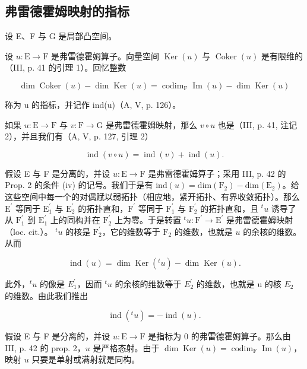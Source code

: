 \subsection{弗雷德霍姆映射的指标}

设 E、F 与 G 是局部凸空间。

设 \(u \colon \mathrm{E} \to \mathrm{F}\) 是弗雷德霍姆算子。向量空间 \(\operatorname{Ker}(u)\) 与 \(\operatorname{Coker}(u)\) 是有限维的（III, p. 41 的引理 1）。回忆整数

\[
\dim \operatorname{Coker} (u) - \dim \operatorname{Ker} (u) = \operatorname{codim} _ {\mathrm{F}} \operatorname{Im} (u) - \dim \operatorname{Ker} (u) \tag {1}
\]

称为 u 的指标，并记作 ind(u)（A, V, p. 126）。

如果 \(u \colon \mathrm{E} \to \mathrm{F}\) 与 \(v \colon \mathrm{F} \to \mathrm{G}\) 是弗雷德霍姆映射，那么 \(v \circ u\) 也是（III, p. 41, 注记 2），并且我们有（A, V, p. 127, 引理 2）

\[
\operatorname{ind} (v \circ u) = \operatorname{ind} (v) + \operatorname{ind} (u).\tag{2}
\]

假设 E 与 F 是分离的，并设 \(u\colon\mathrm{E}\to\mathrm{F}\) 是弗雷德霍姆算子；采用 III, p. 42 的 Prop. 2 的条件 (iv) 的记号。我们于是有 \(\mathrm{ind}(u)=\mathrm{dim}(\mathrm{F}_{2})-\mathrm{dim}(\mathrm{E}_{2})\)。给这些空间中每一个的对偶赋以弱拓扑（相应地，紧开拓扑、有界收敛拓扑）。那么 \(\mathrm{E}^{\prime}\) 等同于 \(\mathrm{E}_{1}^{\prime}\) 与 \(\mathrm{E}_{2}^{\prime}\) 的拓扑直和，\(\mathrm{F}^{\prime}\) 等同于 \(\mathrm{F}_{1}^{\prime}\) 与 \(\mathrm{F}_{2}^{\prime}\) 的拓扑直和，且 \(^{t}u\) 诱导了从 \(\mathrm{F}_{1}^{\prime}\) 到 \(\mathrm{E}_{1}^{\prime}\) 上的同构并在 \(\mathrm{F}_{2}^{\prime}\) 上为零。于是转置 \(^{t}u\colon\mathrm{F}^{\prime}\to\mathrm{E}^{\prime}\) 是弗雷德霍姆映射（loc. cit.）。 \(^{t}u\) 的核是 \(\mathrm{F}_{2}^{\prime}\)，它的维数等于 \(\mathrm{F}_{2}\) 的维数，也就是 \(u\) 的余核的维数。从而

\[
\operatorname{ind} (u) = \dim \operatorname{Ker} (^ {t} u) - \dim \operatorname{Ker} (u).\tag{3}
\]

此外，\(^{t}u\) 的像是 \(E_{1}^{\prime}\)，因而 \(^{t}u\) 的余核的维数等于 \(E_{2}^{\prime}\) 的维数，也就是 u 的核 \(E_{2}\) 的维数。由此我们推出

\[
\operatorname{ind} (^ {t} u) = - \operatorname{ind} (u).\tag{4}
\]

假设 E 与 F 是分离的，并设 \(u\colon\mathrm{E}\to\mathrm{F}\) 是指标为 0 的弗雷德霍姆算子。那么由 III, p. 42 的 prop. 2，\(u\) 是严格态射。由于 \(\dim\operatorname{Ker}(u)=\operatorname{codim}_{\mathrm{F}}\operatorname{Im}(u)\)，映射 \(u\) 只要是单射或满射就是同构。

